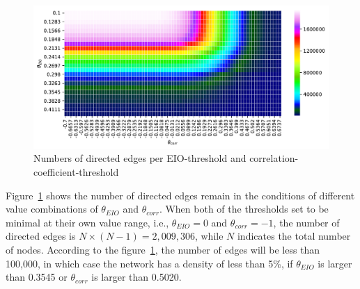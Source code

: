 
\begin{figure}
	\begin{center}
		\includegraphics[width=15cm]{amounts_of_edges_threshold}
	\end{center}
	\caption{Numbers of directed edges per EIO-threshold and correlation-coefficient-threshold}
	\label{fig:amounts_of_edges_threshold}  
\end{figure}

Figure~\ref{fig:amounts_of_edges_threshold} shows the number of directed edges remain in the conditions of different value combinations of $\theta_{EIO}$ and $\theta_{corr}$. When both of the thresholds set to be minimal at their own value range, i.e., $\theta_{EIO}=0$ and $\theta_{corr}=-1$, the number of directed edges is $N\times(N-1)=2,009,306$, while $N$ indicates the total number of nodes. According to the figure~\ref{fig:amounts_of_edges_threshold}, the number of edges will be less than 100,000, in which case the network has a density of less than 5\%, if $\theta_{EIO}$ is larger than 0.3545 or $\theta_{corr}$ is larger than 0.5020. 

